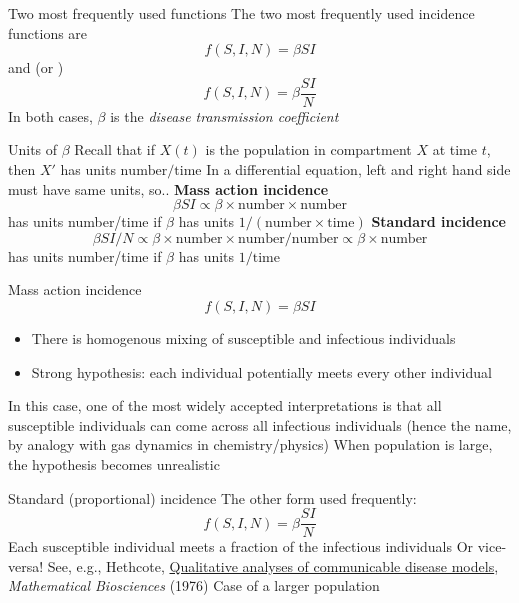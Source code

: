 \documentclass[aspectratio=43]{beamer}
\begin{document}
\begin{frame}{Two most frequently used functions}
The two most frequently used incidence functions are  
\[
f(S,I, N)=\beta SI
\]
and  (or ) 
\[
f(S,I, N)=\beta\frac{SI}{N}
\]
\vfill
In both cases, $\beta$ is the \emph{disease transmission coefficient}
\end{frame}



\begin{frame}{Units of $\beta$}
Recall that if $X(t)$ is the population in compartment $X$ at time $t$, then $X'$ has units $\text{number}/\text{time}$
\vfill
In a differential equation, left and right hand side must have same units, so..
\vfill
\textbf{Mass action incidence}
$$
\beta SI \propto 
\beta\times\text{number}\times\text{number}
$$
has units number/time if $\beta$ has units $1/(\text{number}\times\text{time})$
\vfill
\textbf{Standard incidence}
$$
\beta SI/N \propto 
\beta\times\text{number}\times\text{number}/\text{number} \propto \beta \times\text{number}
$$
has units number/time if $\beta$ has units $1/\text{time}$
\end{frame}


\begin{frame}{Mass action incidence}
\begin{equation}\label{eq:incidence_mass_action}
f(S,I, N)=\beta SI
\end{equation}
\begin{itemize}
\item There is homogenous mixing of susceptible and infectious individuals 
\item Strong hypothesis: each individual potentially meets every other individual
\end{itemize}
\vfill
In this case, one of the most widely accepted interpretations is that all susceptible individuals can come across all infectious individuals (hence the name, by analogy with gas dynamics in chemistry/physics) 
\vfill
When population is large, the hypothesis becomes unrealistic
\end{frame}


\begin{frame}{Standard (proportional) incidence} 
The other form used frequently:
\begin{equation}\label{eq:incidence_proportional}
f(S,I,N)=\beta\frac{SI}{N}
\end{equation}
\vfill
Each susceptible individual meets a fraction of the infectious individuals
\vfill
Or vice-versa! See, e.g., Hethcote, \href{https://doi-org.uml.idm.oclc.org/10.1016/0025-5564(76)90132-2}{Qualitative analyses of communicable disease models}, \emph{Mathematical Biosciences} (1976)
\vfill
Case of a larger population
\end{frame}
\end{document}
